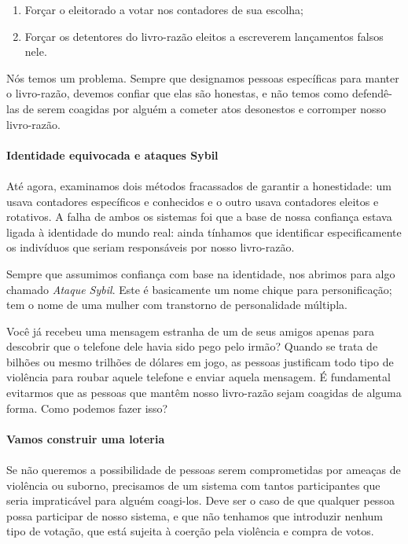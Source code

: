 \begin{samepage}
\begin{enumerate}
\item Forçar o eleitorado a votar nos contadores de sua escolha;
\item Forçar os detentores do livro-razão eleitos a escreverem lançamentos falsos nele.
\end{enumerate}
\end{samepage}

Nós temos um problema. Sempre que designamos pessoas específicas para manter o livro-razão, devemos confiar que elas são honestas, e não temos como defendê-las de serem coagidas por alguém a cometer atos desonestos e corromper nosso livro-razão.

\paragraph{Identidade equivocada e ataques Sybil}
\paragraph{}
Até agora, examinamos dois métodos fracassados de garantir a honestidade: um usava contadores específicos e conhecidos e o outro usava contadores eleitos e rotativos. A falha de ambos os sistemas foi que a base de nossa confiança estava ligada à identidade do mundo real: ainda tínhamos que identificar especificamente os indivíduos que seriam responsáveis por nosso livro-razão.

Sempre que assumimos confiança com base na identidade, nos abrimos para algo chamado \textit{Ataque Sybil}. Este é basicamente um nome chique para personificação; tem o nome de uma mulher com transtorno de personalidade múltipla.

Você já recebeu uma mensagem estranha de um de seus amigos apenas para descobrir que o telefone dele havia sido pego pelo irmão? Quando se trata de bilhões ou mesmo trilhões de dólares em jogo, as pessoas justificam todo tipo de violência para roubar aquele telefone e enviar aquela mensagem. É fundamental evitarmos que as pessoas que mantêm nosso livro-razão sejam coagidas de alguma forma. Como podemos fazer isso?

\paragraph{Vamos construir uma loteria}
\paragraph{}
Se não queremos a possibilidade de pessoas serem comprometidas por ameaças de violência ou suborno, precisamos de um sistema com tantos participantes que seria impraticável para alguém coagi-los. Deve ser o caso de que qualquer pessoa possa participar de nosso sistema, e que não tenhamos que introduzir nenhum tipo de votação, que está sujeita à coerção pela violência e compra de votos.

